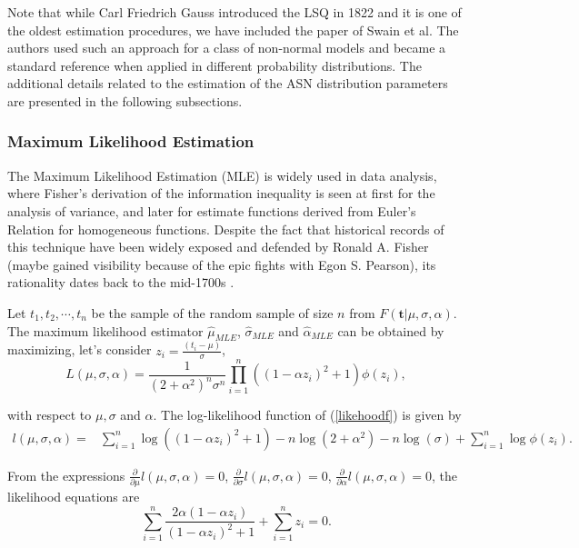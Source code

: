 \documentclass[]{interact}
\theoremstyle{plain}%
\theoremstyle{definition}
\theoremstyle{remark}
\begin{document}
Note that while Carl Friedrich Gauss introduced the LSQ in 1822 and it is one of the oldest estimation procedures, we have included the paper of Swain et al. \cite{swain1988least}
 The authors used such an approach for a class of non-normal models and became a standard reference when applied in different probability distributions. The additional details related to the estimation of the ASN distribution parameters are presented in the following subsections.

\subsubsection{Maximum Likelihood Estimation}

The Maximum Likelihood Estimation (MLE) is widely used in data analysis, where Fisher's derivation of the information inequality is seen at first for the analysis of variance, and later for estimate functions derived from Euler's Relation for homogeneous functions. Despite the fact that historical records of this technique have been widely exposed and defended by Ronald A. Fisher (maybe gained visibility because of the epic fights with Egon S. Pearson), its rationality dates back to the mid-1700s \cite{stigler2007epic}.

Let $t_{1}, t_{2},\cdots,t_{n}$ be the sample of the random sample of size $n$ from $F(\boldsymbol{t}| \mu,\sigma,\alpha)$. The maximum likelihood estimator $\hat{\mu}_{MLE}$, $\hat{\sigma}_{MLE}$ and $\hat{\alpha}_{MLE}$ can be obtained by maximizing, let's consider $z_i=\frac{(t_i-\mu)}{\sigma}$,
\begin{equation}\label{likehoodf}
L\left( \mu,\sigma,\alpha\right) = \frac{1}{(2+\alpha^2)^n\sigma^n}\prod_{i=1}^{n} \left((1-\alpha z_i)^2+1 \right)\phi\left(z_i\right),
\end{equation}

with respect to $\mu, \sigma $ and $\alpha$. The log-likelihood function of (\ref{likehoodf}) is given by
\begin{equation}\label{loglikehoodf}
\begin{aligned}
l\left( \mu,\sigma,\alpha\right) =& \sum_{i=1}^{n}\log \left((1-\alpha z_i)^2+1 \right)-n\log\left(2+\alpha^2 \right)-n\log(\sigma)+\sum_{i=1}^{n}\log\phi\left(z_i\right).
\end{aligned}
\end{equation}

From the expressions $\frac{\partial}{\partial \mu}l(\mu,\sigma,\alpha)=0$, $\frac{\partial}{\partial \sigma}l(\mu,\sigma,\alpha)=0$, $\frac{\partial}{\partial \alpha}l(\mu,\sigma,\alpha)=0$, the likelihood equations are
\begin{equation}\label{verogg21} 
\sum_{i=1}^{n}\frac{2\alpha(1-\alpha z_i)}{\left(1-\alpha z_i\right)^2+1} +\sum_{i=1}^{n} z_i=0.
\end{equation}
\end{document}
